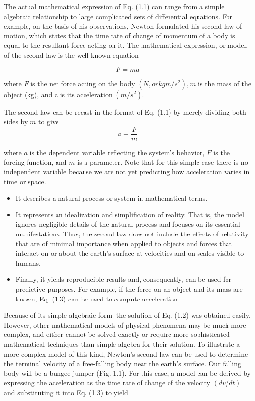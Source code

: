 \documentclass[../main.tex]{subfiles}
\begin{document}
The actual mathematical expression of Eq. (1.1) can range from a simple algebraic
relationship to large complicated sets of differential equations. For example, on the basis of
his observations, Newton formulated his second law of motion, which states that the time
rate of change of momentum of a body is equal to the resultant force acting on it. The mathematical expression, or model, of the second law is the well-known equation

\begin{equation}
\tag{1.2}
F=ma
\end{equation}

where $F$ is the net force acting on the body $(N, or kg m/s^2
), m$ is the mass of the object (kg),
and a is its acceleration $(m/s^2
)$.

The second law can be recast in the format of Eq. (1.1) by merely dividing both sides
by $m$ to give
\begin{equation}
\tag{1.3}
a=\dfrac{F}{m}
\end{equation}

where $a$ is the dependent variable reflecting the system's behavior, $F$ is the forcing function, and $m$ is a parameter. Note that for this simple case there is no independent variable
because we are not yet predicting how acceleration varies in time or space.

\begin{itemize}
\item  It describes a natural process or system in mathematical terms.
\item It represents an idealization and simplification of reality. That is, the model ignores negligible details of the natural process and focuses on its essential manifestations. Thus,
the second law does not include the effects of relativity that are of minimal importance
when applied to objects and forces that interact on or about the earth's surface at velocities and on scales visible to humans.
\item  Finally, it yields reproducible results and, consequently, can be used for predictive purposes. For example, if the force on an object and its mass are known, Eq. (1.3) can be
used to compute acceleration.

\end{itemize}


Because of its simple algebraic form, the solution of Eq. (1.2) was obtained easily.
However, other mathematical models of physical phenomena may be much more complex,
and either cannot be solved exactly or require more sophisticated mathematical techniques
than simple algebra for their solution. To illustrate a more complex model of this kind,
Newton's second law can be used to determine the terminal velocity of a free-falling body
near the earth's surface. Our falling body will be a bungee jumper (Fig. 1.1). For this case,
a model can be derived by expressing the acceleration as the time rate of change of the
velocity $(dv/dt)$ and substituting it into Eq. (1.3) to yield
\end{document}
